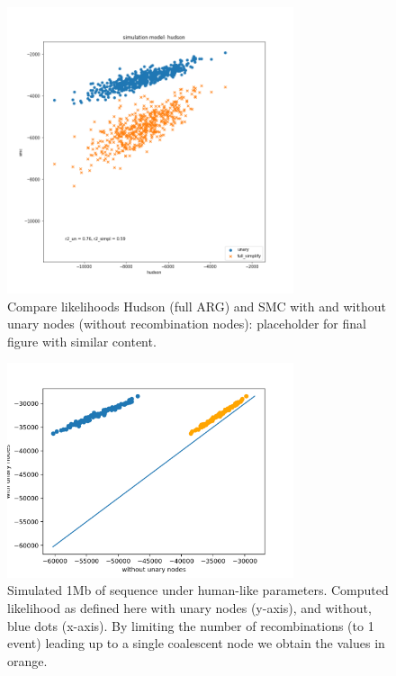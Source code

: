 \documentclass{article}
\begin{document}
\begin{figure}[!ht]
\centering
\includegraphics[width=0.75\textwidth]{figures/supplementary-figs/v_hudson_unary_simpl.png}
\caption{Compare likelihoods Hudson (full ARG) and SMC with and without unary nodes (without recombination nodes): placeholder for final figure with similar content.}
\label{sup:fig:vs-hudson}
\end{figure}


\begin{figure}[!ht]
\centering
\includegraphics[width=0.75\textwidth]{figures/supplementary-figs/without_unary.png}
\caption{Simulated 1Mb of sequence under human-like parameters. Computed likelihood as defined here with unary nodes (y-axis), and without, blue dots (x-axis). By limiting the number of recombinations (to 1 event) leading up to a single coalescent node we obtain the values in orange.}
 \label{sup:fig:rec-correction}
\end{figure}
\end{document}
